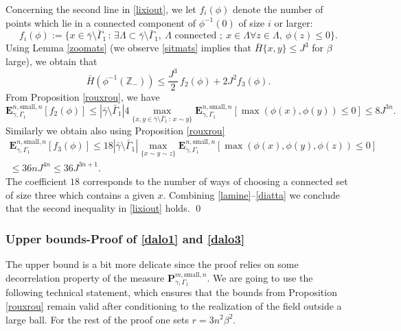 \documentclass[JEP,XML,SOM,Unicode, NoFloatCountersInSection]{cedram}
\newcommand{\sep}{\,:\,}
\numberwithin{equation}{section}
\theoremstyle{plain}
\theoremstyle{definition}
\newcommand{\sm}{\mathrm{small}}
\newcommand{\bP}{{\ensuremath{\mathbf P}} }
\newcommand{\bE}{{\ensuremath{\mathbf E}} }
\newcommand{\bbZ}{{\ensuremath{\mathbb Z}} }
\newcommand{\gb}{\beta}
\newcommand{\gG}{\Gamma}
\newcommand{\gL}{\Lambda}
\begin{document}
Concerning the second line in \eqref{lixiout}, we let $f_{i}(\phi)$ denote the number
of points which lie in a connected component of $\phi^{-1}(0)$ of size $i$ or larger:\vspace*{-3pt}
\begin{equation*}
f_{i}(\phi):=\{ x\in \bar\gamma \setminus \bar \gG_1 \sep \exists \gL\subset \bar\gamma \setminus \bar \gG_1,\ \gL \text{ connected };\ x\in \gL \forall z\in \gL, \ \phi(z)\le 0 \}.
\end{equation*}
Using Lemma \ref{zoomats} (we observe \eqref{sitmats} implies that $\bar H \{ x,y\} \le J^3$ for $\gb$ large), we obtain that\vspace*{-3pt}
\begin{equation}\label{lamine}
\bar H(\phi^{-1}(\bbZ_-))\le \frac{J^{3}}{2}\,f_2(\phi)+ 2 J^{2}f_{3}(\phi).
\end{equation}
From Proposition \ref{rouxrou}, we have
\begin{equation*}
\bE^{n,\sm,n}_{\gamma,\gG_1}[f_2(\phi)]
\le |\bar \gamma \setminus \bar \gG_1|4\max_{\{x,y \in \bar \gamma \setminus \bar \gG_1 \sep x\sim y\}}\bE^{n,\sm,n}_{\gamma,\gG_1}[ \max(\phi(x),\phi(y))\le 0]
\le 8 J^{3n}.
\end{equation*}
Similarly we obtain also using Proposition \ref{rouxrou}\vspace*{-3pt}\enlargethispage{.5\baselineskip}%
\begin{multline}\label{diatta}
\bE^{n,\sm,n}_{\gamma,\gG_1}[f_3(\phi)]\le 18
|\bar \gamma \setminus \bar\gG_1| \max_{\{x\sim y \sim z\}} \bE^{n,\sm,n}_{\gamma,\gG_1}[ \max(\phi(x),\phi(y),\phi(z))\le 0]\\[-3pt]
\le 36n J^{4n}\le 36 J^{3n+1}.
\end{multline}
The coefficient $18$ corresponds to the number of ways of choosing a connected set of size three which contains a given $x$.
Combining \eqref{lamine}--\eqref{diatta} we conclude that the second inequality in \eqref{lixiout} holds.
\qed

\subsubsection{Upper bounds-Proof of \eqref{dalo1} and \eqref{dalo3}}

The upper bound is a bit more delicate since the proof relies on some decorrelation property of the measure $\bP^{m,\sm,n}_{\gamma,\gG_1}$.
We are going to use the following technical statement, which ensures that the bounds from
Proposition \ref{rouxrou} remain valid after conditioning to the realization of the field outside a large ball.
For the rest of the proof one sets $r=3n^2\gb^2$.
\end{document}
